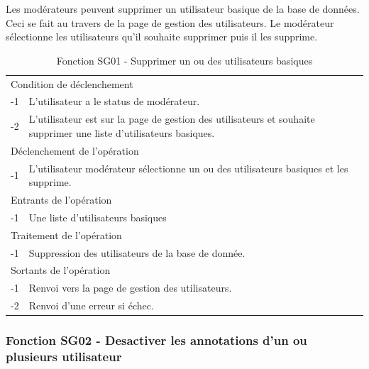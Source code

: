 \documentclass[a4paper]{article}
\begin{document}
Les modérateurs peuvent supprimer un utilisateur basique de la base de données. Ceci se fait au travers de la page de gestion des utilisateurs. Le modérateur sélectionne les utilisateurs qu'il souhaite supprimer puis il les supprime.

\begin{table}[H]
  \centering
   \small
	\begin{tabular}{|c|p{12cm}|}
   		\hline
   			\rowcolor{lightgray}\multicolumn{2}{|c|}{\textbf{Fonction SG01 - Supprimer un ou des utilisateurs}} \\
   		\hline
   			\multicolumn{2}{|l|}{Condition de déclenchement} \\
   		\hline
   			-1 & L'utilisateur a le status de modérateur.\\
        			-2 & L'utilisateur est sur la page de gestion des utilisateurs et souhaite supprimer une liste d'utilisateurs basiques.\\
        
   		\hline
   			\multicolumn{2}{|l|}{Déclenchement de l'opération} \\
   		\hline
   			-1 & L'utilisateur modérateur sélectionne un ou des utilisateurs basiques et les supprime.\\
   		\hline
   			\multicolumn{2}{|l|}{Entrants de l'opération} \\
   		\hline
   			-1 & Une liste d'utilisateurs basiques\\
   		\hline
   			\multicolumn{2}{|l|}{Traitement de l'opération} \\
  		\hline
   			-1 & Suppression des utilisateurs de la base de donnée.\\
   		\hline
   			\multicolumn{2}{|l|}{Sortants de l'opération} \\
   		\hline
   			-1 & Renvoi vers la page de gestion des utilisateurs.\\
        			-2 & Renvoi d'une erreur si échec.\\ 
   		\hline
	\end{tabular}
  \caption{Fonction SG01 - Supprimer un ou des utilisateurs basiques}
  \normalsize
  \label{tab: supprimmer_utilisateur_basique}
\end{table}


\subsubsection{Fonction SG02 - Desactiver les annotations d'un ou plusieurs utilisateur}
\end{document}

